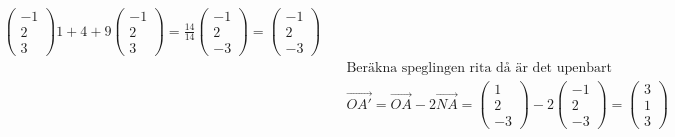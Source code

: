 \begin{align*}
{    \begin{pmatrix} -1 \\ 2 \\ 3 \end{pmatrix}}{1+4+9}
  \begin{pmatrix} -1 \\ 2 \\ 3 \end{pmatrix}=
  \frac{14}{14}\begin{pmatrix} -1 \\ 2 \\ -3 \end{pmatrix} =
  \begin{pmatrix} -1 \\ 2 \\ -3 \end{pmatrix} \\
  &\quad  \text{Beräkna speglingen rita då är det upenbart } \\
  &\quad  \overrightarrow{OA'}= \overrightarrow{OA}-2\overrightarrow{NA}=
  \begin{pmatrix} 1 \\ 2 \\ -3 \end{pmatrix}-
  2\begin{pmatrix} -1 \\ 2 \\ -3 \end{pmatrix}=
  \begin{pmatrix} 3 \\ 1 \\ 3 \end{pmatrix} \\
\end{align*}



